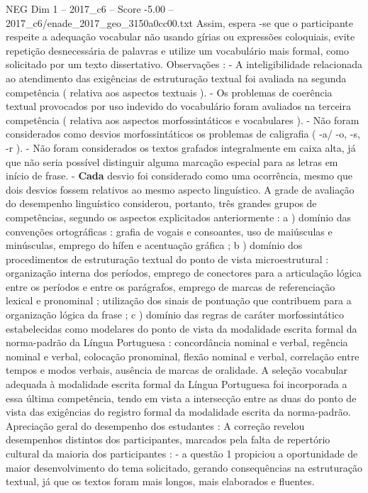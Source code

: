\begin{textsample}{NEG Dim 1 – 2017\_c6 – Score -5.00 – 2017\_c6/enade\_2017\_geo\_3150a0cc00.txt}
Assim, espera -se que o participante respeite a adequação vocabular não usando gírias ou expressões coloquiais, evite repetição desnecessária de palavras e utilize um vocabulário mais formal, como solicitado por um texto dissertativo.
Observações : - A inteligibilidade relacionada ao atendimento das exigências de estruturação textual foi avaliada na segunda competência ( relativa aos aspectos textuais ). - Os problemas de coerência textual provocados por uso indevido do vocabulário foram avaliados na terceira competência ( relativa aos aspectos morfossintáticos e vocabulares ). - Não foram considerados como desvios morfossintáticos os problemas de caligrafia ( -a/ -o, -s, -r ). - Não foram considerados os textos grafados integralmente em caixa alta, já que não seria possível distinguir alguma marcação especial para as letras em início de frase. - \textbf{Cada} desvio foi considerado como uma ocorrência, mesmo que dois desvios fossem relativos ao mesmo aspecto linguístico.
A grade de avaliação do desempenho linguístico considerou, portanto, três grandes grupos de competências, segundo os aspectos explicitados anteriormente : a ) domínio das convenções ortográficas : grafia de vogais e consoantes, uso de maiúsculas e minúsculas, emprego do hífen e acentuação gráfica ; b ) domínio dos procedimentos de estruturação textual do ponto de vista microestrutural : organização interna dos períodos, emprego de conectores para a articulação lógica entre os períodos e entre os parágrafos, emprego de marcas de referenciação lexical e pronominal ; utilização dos sinais de pontuação que contribuem para a organização lógica da frase ; c ) domínio das regras de caráter morfossintático estabelecidas como modelares do ponto de vista da modalidade escrita formal da norma-padrão da Língua Portuguesa : concordância nominal e verbal, regência nominal e verbal, colocação pronominal, flexão nominal e verbal, correlação entre tempos e modos verbais, ausência de marcas de oralidade.
A seleção vocabular adequada à modalidade escrita formal da Língua Portuguesa foi incorporada a essa última competência, tendo em vista a intersecção entre as duas do ponto de vista das exigências do registro formal da modalidade escrita da norma-padrão.
Apreciação geral do desempenho dos estudantes : A correção revelou desempenhos distintos dos participantes, marcados pela falta de repertório cultural da maioria dos participantes : - a questão 1 propiciou a oportunidade de maior desenvolvimento do tema solicitado, gerando consequências na estruturação textual, já que os textos foram mais longos, mais elaborados e fluentes.

\end{textsample}
